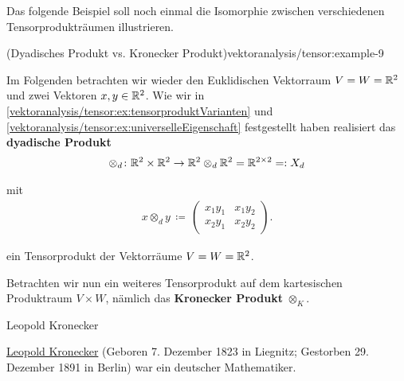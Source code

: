 \par
Das folgende Beispiel soll noch einmal die Isomorphie zwischen verschiedenen Tensorprodukträumen illustrieren.
\begin{example}{(Dyadisches Produkt vs. Kronecker Produkt)}{vektoranalysis/tensor:example-9}



\par
Im Folgenden betrachten wir wieder den Euklidischen Vektorraum \(V=W=\mathbb{R}^2\) und zwei Vektoren \(x, y \in \mathbb{R}^2\).
Wie wir in \cref{vektoranalysis/tensor:ex:tensorproduktVarianten} und \cref{vektoranalysis/tensor:ex:universelleEigenschaft} festgestellt haben realisiert das \textbf{dyadische Produkt}
\begin{align*}
\otimes_d \colon \mathbb{R}^2 \times \mathbb{R}^2 \rightarrow \mathbb{R}^2 \otimes_d \mathbb{R}^2 = \mathbb{R}^{2 \times 2} =: X_d
\end{align*}
\par
mit
\begin{align*}
x \otimes_d y \, \coloneqq \,
\begin{pmatrix}
x_1y_1 & x_1y_2 \\
x_2y_1 & x_2y_2
\end{pmatrix}.
\end{align*}
\par
ein Tensorprodukt der Vektorräume \(V=W=\mathbb{R}^2\).

\par
Betrachten wir nun ein weiteres Tensorprodukt auf dem kartesischen Produktraum \(V \times W\), nämlich das \textbf{Kronecker Produkt} \(\otimes_K\).

\begin{emphBox}{Leopold Kronecker}{}

\par
\href{https://de.wikipedia.org/wiki/Leopold\_Kronecker}{Leopold Kronecker} (Geboren 7. Dezember 1823 in Liegnitz; Gestorben 29. Dezember 1891 in Berlin) war ein deutscher Mathematiker.
\end{emphBox}


\end{example}
